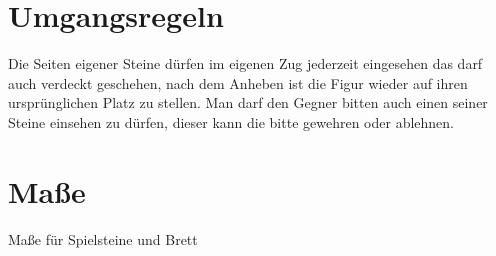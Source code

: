 \documentclass{article}
\begin{document}
\section{Umgangsregeln}
Die Seiten eigener Steine dürfen im eigenen Zug jederzeit eingesehen das darf auch verdeckt geschehen, nach dem Anheben ist die Figur wieder auf ihren ursprünglichen Platz zu stellen. Man darf den Gegner bitten auch einen seiner Steine einsehen zu dürfen, dieser kann die bitte gewehren oder ablehnen.

\section{Maße}
Maße für Spielsteine und Brett

	
\end{document}

